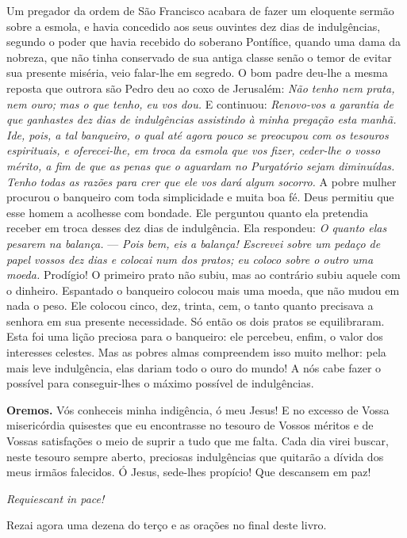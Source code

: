 Um pregador da ordem de São Francisco acabara de fazer um eloquente sermão sobre a esmola, e havia concedido aos seus ouvintes dez dias de indulgências, segundo o poder que havia recebido do soberano Pontífice, quando uma dama da nobreza, que não tinha conservado de sua antiga classe senão o temor de evitar sua presente miséria, veio falar-lhe em segredo. O bom padre deu-lhe a mesma reposta que outrora são Pedro deu ao coxo de Jerusalém: \textit{Não tenho nem prata, nem ouro; mas o que tenho, eu vos dou.} E continuou: \textit{Renovo-vos a garantia de que ganhastes dez dias de indulgências assistindo à minha pregação esta manhã. Ide, pois, a tal banqueiro, o qual até agora pouco se preocupou com os tesouros espirituais, e oferecei-lhe, em troca da esmola que vos fizer, ceder-lhe o vosso mérito, a fim de que as penas que o aguardam no Purgatório sejam diminuídas. Tenho todas as razões para crer que ele vos dará algum socorro.} A pobre mulher procurou o banqueiro com toda simplicidade e muita boa fé. Deus permitiu que esse homem a acolhesse com bondade. Ele perguntou quanto ela pretendia receber em troca desses dez dias de indulgência. Ela respondeu: \textit{O quanto elas pesarem na balança.} --- \textit{Pois bem, eis a balança! Escrevei sobre um pedaço de papel vossos dez dias e colocai num dos pratos; eu coloco sobre o outro uma moeda.} Prodígio! O primeiro prato não subiu, mas ao contrário subiu aquele com o dinheiro. Espantado o banqueiro colocou mais uma moeda, que não mudou em nada o peso. Ele colocou cinco, dez, trinta, cem, o tanto quanto precisava a senhora em sua presente necessidade. Só então os dois pratos se equilibraram. Esta foi uma lição preciosa para o banqueiro: ele percebeu, enfim, o valor dos interesses celestes. Mas as pobres almas compreendem isso muito melhor: pela mais leve indulgência, elas dariam todo o ouro do mundo! A nós cabe fazer o possível para conseguir-lhes o máximo possível de indulgências.

\vspace{\baselineskip}\noindent \textbf{Oremos.} Vós conheceis minha indigência, ó meu Jesus! E no excesso de Vossa misericórdia quisestes que eu encontrasse no tesouro de Vossos méritos e de Vossas satisfações o meio de suprir a tudo que me falta. Cada dia virei buscar, neste tesouro sempre aberto, preciosas indulgências que quitarão a dívida dos meus irmãos falecidos. Ó Jesus, sede-lhes propício! Que descansem em paz!



\begin{center}
\textit{Requiescant in pace!}
\end{center}

Rezai agora uma dezena do terço e as orações no final deste livro.
